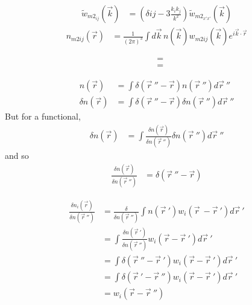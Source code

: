 \documentclass[double,12pt]{beavtex}
\begin{document}
\begin{align}
    \widetilde{w}_{m2_{ij}}(\vec{k}) &= (\delta{ij}-3\frac{k_ik_j}{k^2})
                                    \widetilde{w}_{{m2}_{x'x'}}(\vec{k})
\end{align}
\begin{align}
    n_{m2ij}(\vec r) &=  \frac{1}{\left(2\pi\right)^3}\int d\vec k\, 
                       n(\vec k) w_{m2ij}(\vec k)e^{i\vec k\cdot \vec r}
\end{align} 

\color{white}
\begin{align}
     &=  \\ 
     &= 
\end{align} 
\color{black}

\begin{align} 
  n(\vec r) &= \int \delta (\vec r~''-\vec r)n(\vec r~'') d\vec r~''\\
  \delta n(\vec r) &= \int \delta (\vec r~''-\vec r)\delta n(\vec r~'')
  d\vec r~''
\end{align} 
But for a functional,
\begin{align} 
\delta n(\vec r) &= \int \frac{\delta n(\vec r)}{\delta n(\vec r~'')}
\delta n(\vec r~'')d\vec r~''
\end{align} 
and so
\begin{align} 
  \frac{\delta n(\vec r)}{\delta n(\vec r~'')} &= \delta (\vec r~''-\vec r)
\end{align} 

\begin{align} 
   \frac{\delta n_i(\vec r)}{\delta n(\vec r~'')}  &= \frac{\delta}
   {\delta n(\vec r~'')}\int n(\vec r~')w_i(\vec r~-\vec r~')d\vec r~'\\
   &= \int \frac{\delta n(\vec r~')}{\delta n(\vec r~'')}w_i(\vec r
   -\vec r~') d\vec r~' \\
   &= \int \delta (\vec r~'' -\vec r~')w_i(\vec r-\vec r~') d\vec r~'\\
   &= \int \delta (\vec r~' -\vec r~'')w_i(\vec r-\vec r~') d\vec r~'\\
   &= w_i(\vec r-\vec r~'') 
\end{align}   
\end{document}
